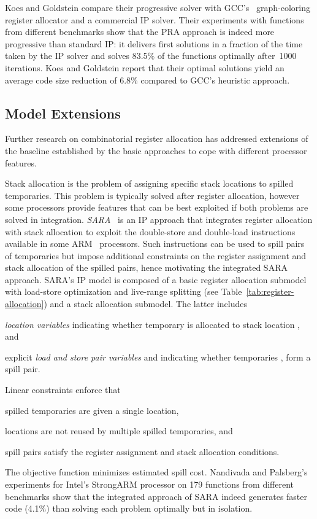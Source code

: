 \documentclass[acmsmall,authorversion,nonacm]{acmart}
\newcommand{\var}[2]{}
\begin{document}
Koes and Goldstein compare their progressive solver with
GCC's~\cite{GCC2017} graph-coloring register allocator and a
commercial IP solver.
Their experiments with functions from different benchmarks show that
the PRA approach is indeed more progressive than standard IP: it
delivers first solutions in a fraction of the time taken by the IP
solver and solves 83.5\% of the functions optimally after~1000
iterations.
Koes and Goldstein report that their optimal solutions yield an
average code size reduction of 6.8\% compared to GCC's heuristic
approach.

\subsection{Model Extensions}\label{sec:model-extensions}

Further research on combinatorial register allocation has addressed
extensions of the baseline established by the basic approaches to cope
with different processor features.

Stack allocation is the problem of assigning specific stack locations
to spilled temporaries.
This problem is typically solved after register allocation, however
some processors provide features that can be best exploited if both
problems are solved in integration.
\emph{SARA}~\cite{Nandivada2006} is an IP approach that integrates
register allocation with stack allocation to exploit the double-store
and double-load instructions available in some ARM~\cite{ARM}
processors.
Such instructions can be used to spill pairs of temporaries but impose
additional constraints on the register assignment and stack allocation
of the spilled pairs, hence motivating the integrated SARA approach.
SARA's IP model is composed of a basic register allocation submodel
with load-store optimization and live-range splitting (see
Table~\ref{tab:register-allocation}) and a stack allocation submodel.
The latter includes
\begin{inparaitem}[]
\item \emph{location variables} \var{f}{t,l} indicating whether
  temporary  is allocated to stack location , and
\item explicit \emph{load and store pair variables}
  \var{load-pair}{i,t_1,t_2} and \var{store-pair}{i,t_1,t_2}
  indicating whether temporaries ,  form a spill pair.
\end{inparaitem}
Linear constraints enforce that
\begin{inparaitem}[]
\item spilled temporaries are given a single location,
\item locations are not reused by multiple spilled temporaries, and
\item spill pairs satisfy the register assignment and stack allocation
  conditions.
\end{inparaitem}
The objective function minimizes estimated spill cost.
Nandivada and Palsberg's experiments for Intel's StrongARM processor
on 179 functions from different benchmarks show that the integrated
approach of SARA indeed generates faster code (4.1\%) than solving
each problem optimally but in isolation.
\end{document}
